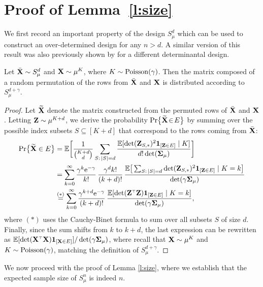 \section{Proof of Lemma~\ref{l:size}}
\label{appx: proof-of-l-size}

We first record an important property of the design $S_\mu^d$
which can be used to construct an over-determined design for any $n>d$. A similar
version of this result was also previously shown by
\cite{correcting-bias-journal} for a different determinantal design.

\begin{lemma}\label{l:decomposition}
  Let ${\bar{\mathbf X}}\sim S_\mu^d$ and $\mathbf X\sim \mu^K$, where
  $K\sim{\operatorname{Poisson}}(\gamma)$. Then the matrix composed of a random
  permutation of the rows from ${\bar{\mathbf X}}$ and $\mathbf X$ is distributed according to
  $S_\mu^{d+\gamma}$.
\end{lemma}

\begin{proof}
Let $\widetilde{\mathbf{X}}$ denote the matrix constructed from the permuted rows of
${\bar{\mathbf X}}$ and $\mathbf X$.  Letting $\mathbf Z\sim\mu^{K+d}$, we derive the probability
$\mathrm{Pr}\big\{\widetilde{\mathbf{X}}\!\in\! E\big\}$ by summing over the possible index subsets  $S\subseteq
[K+d]$ that correspond to the rows coming from ${\bar{\mathbf X}}$:
\begin{align*}
  \Pr\big\{\Xt\in E\big\} &= \E\bigg[\frac{1}{\binom{K+d}{d}}
  \sum_{S:\,|S|=d}\frac{\E[\det(\Z_{S,*})^2\one_{[\Z\in E]}\mid
  K]}{d!\det(\Sigmab_\mu)}\bigg]\\
  &=\sum_{k=0}^\infty
    \frac{\gamma^k\ee^{-\gamma}}{k!}\,\frac{\gamma^dk!}{(k+d)!}\,
    \frac{\E\big[\sum_{S:\,|S|=d}\det(\Z_{S,*})^2\one_{[\Z\in E]}\mid
    K=k\big]}{\det(\gamma\Sigmab_\mu)}\\
  &\overset{(*)}{=} \sum_{k=0}^\infty
    \frac{\gamma^{k+d}\ee^{-\gamma}}{(k+d)!}
    \,\frac{\E[\det(\Z^\top\Z)\one_{[\Z\in E]}\mid K=k]}{\det(\gamma\Sigmab_\mu)},
\end{align*}
where $(*)$ uses the Cauchy-Binet formula to sum over all subsets $S$
of size $d$. Finally, since the sum shifts from $k$
to $k+d$, the last expression can be rewritten as
$\E[\det(\X^\top\X)\one_{[\X\in E]}]/\det(\gamma\Sigmab_\mu)$, where recall that
$\mathbf X\sim\mu^K$ and $K\sim{\operatorname{Poisson}}(\gamma)$, matching the definition of $S_\mu^{d+\gamma}$.
\end{proof}

We now proceed with the proof of Lemma \ref{l:size}, where we establish
that the expected sample size of $S_\mu^n$ is indeed $n$.


